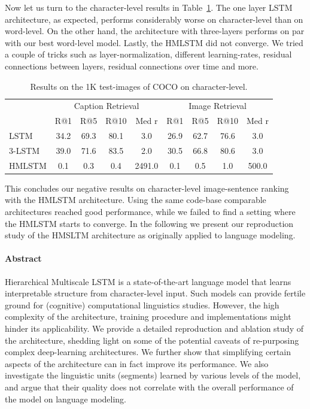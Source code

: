 Now let us turn to the character-level results in Table~\ref{tab:hmlstmfailchar}. The one layer LSTM architecture, as expected, performs 
considerably worse on character-level than on word-level. On the other hand, the architecture with three-layers performs on par with our
best word-level model. Lastly, the HMLSTM did not converge. We tried a couple of tricks such as layer-normalization, different learning-rates,
residual connections between layers, residual connections over time and more. 

\begin{table}[]
    \centering
	    \begin{tabular}{lcccccccc}
			& \multicolumn{4}{c}{Caption Retrieval}  & \multicolumn{4}{c}{Image Retrieval} \\
		    & R@1 & R@5 & R@10 & Med r & R@1 & R@5 & R@10 & Med r \\				            
		    LSTM & 34.2  & 69.3 &  80.1 &  3.0 & 26.9 & 62.7 & 76.6 & 3.0 \\
			3-LSTM & 39.0 & 71.6 & 83.5 & 2.0 &  30.5 & 66.8 & 80.6 & 3.0 \\
			HMLSTM & 0.1 & 0.3 & 0.4 & 2491.0 & 0.1 & 0.5 & 1.0 & 500.0\\
		\end{tabular}
		\caption{Results on the 1K test-images of COCO on character-level.}
	\label{tab:hmlstmfailchar}
\end{table}


This concludes our negative results on character-level image-sentence ranking with the HMLSTM architecture. Using the same code-base
comparable architectures reached good performance, while we failed to find a setting where the HMLSTM starts to converge. 
In the following we present our reproduction study of the HMSLTM architecture as originally applied to language modeling.

\paragraph{Abstract}
Hierarchical Multiscale LSTM \citep{chung2016hierarchical} is a state-of-the-art language model that learns interpretable structure from character-level input. Such models can provide fertile ground for (cognitive) computational linguistics studies. However, the high complexity of the architecture, training procedure and implementations might hinder its applicability.  We provide a detailed reproduction and ablation study of the architecture, shedding light on some of the potential caveats of re-purposing complex deep-learning architectures. We further show that simplifying certain aspects of the architecture can in fact improve its performance. We also investigate the linguistic units (segments) learned by various levels of the model, and argue that their quality does not correlate with the overall performance of the model on language modeling. 

